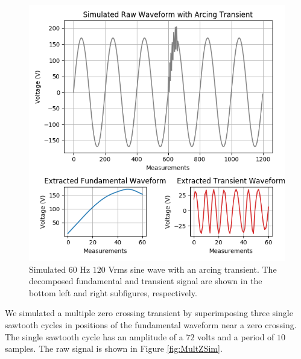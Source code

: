 \documentclass[10pt, conference, compsocconf]{IEEEtran}
\begin{document}
\begin{figure}[ht]
\centering%
\includegraphics[scale=0.35]{./figures/arcing_sim.png}
\caption{Simulated $60$ Hz $120$ Vrms sine wave with an arcing transient. The decomposed fundamental and transient signal are shown in the bottom left and right subfigures, respectively.}\label{fig:ArcingSim}
\end{figure}


We simulated a multiple zero crossing transient by superimposing three single sawtooth cycles in positions of the fundamental waveform near a zero crossing. The single sawtooth cycle has an amplitude of a $72$ volts and a period of $10$ samples. The raw signal is shown in Figure \ref{fig:MultZSim}.
\end{document}
